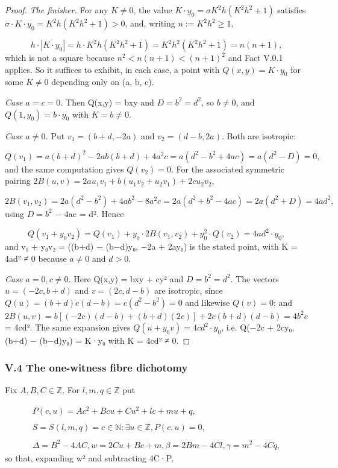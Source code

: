 \documentclass[11pt]{article}
\theoremstyle{plain}
\theoremstyle{definition}
\theoremstyle{remark}
\theoremstyle{plain}
\theoremstyle{definition}
\theoremstyle{remark}
\theoremstyle{plain}
\theoremstyle{definition}
\theoremstyle{remark}
\begin{document}
\begin{proof}
\emph{The finisher.} For any $K ≠ 0$, the value $K·y_{0} = σK^{2}h(K^{2}h^{2} + 1)$ satisfies $σ·K·y_{0} = K^{2}h(K^{2}h^{2} + 1) > 0$, and, writing $n := K^{2}h^{2} ≥ 1$,

\[
h·|K·y_{0}| = h·K^{2}h(K^{2}h^{2} + 1) = K^{2}h^{2}(K^{2}h^{2} + 1) = n(n + 1),
\]
which is not a square because $n^{2} < n(n+1) < (n+1)^{2}$ and Fact V.0.1 applies. So it suffices to exhibit, in each case, a point with $Q(x,y) = K·y_{0}$ for some $K ≠ 0$ depending only on (a, b, c).

\emph{Case $a = c = 0$.} Then Q(x,y) = bxy and $D = b^{2} = d^{2}$, so $b ≠ 0$, and $Q(1, y_{0}) = b·y_{0}$ with $K = b ≠ 0$.

\emph{Case $a ≠ 0$.} Put $v_{1} = (b+d, −2a)$ and $v_{2} = (d−b, 2a)$. Both are isotropic:

\[
Q(v_{1}) = a(b+d)^{2} − 2ab(b+d) + 4a^{2}c = a(d^{2} − b^{2} + 4ac) = a(d^{2} − D) = 0,
\]
and the same computation gives $Q(v_{2}) = 0$. For the associated symmetric pairing $2B(u,v) = 2a u_{1}v_{1} + b(u_{1}v_{2} + u_{2}v_{1}) + 2c u_{2}v_{2}$,

\[
2B(v_{1},v_{2}) = 2a(d^{2} − b^{2}) + 4ab^{2} − 8a^{2}c = 2a(d^{2} + b^{2} − 4ac) = 2a(d^{2} + D) = 4ad^{2},
\]
using $D = b^{2}$ − 4ac = d². Hence

\[
Q(v_{1} + y_{0}v_{2}) = Q(v_{1}) + y_{0}·2B(v_{1},v_{2}) + y_{0}^{2}·Q(v_{2}) = 4ad^{2}·y_{0},
\]
and v₁ + y₀v₂ = ((b+d) − (b−d)y₀, −2a + 2ay₀) is the stated point, with K = 4ad² ≠ 0 because $a ≠ 0$ and $d > 0$.

\emph{Case $a = 0, c ≠ 0$.} Here Q(x,y) = bxy + cy² and $D = b^{2} = d^{2}$. The vectors $u = (−2c, b+d)$ and $v = (2c, d−b)$ are isotropic, since $Q(u) = (b+d)c(d−b) = c(d^{2} − b^{2}) = 0$ and likewise $Q(v) = 0$; and $2B(u,v) = b[(−2c)(d−b) + (b+d)(2c)] + 2c(b+d)(d−b) = 4b^{2}c$ = 4cd². The same expansion gives $Q(u + y_{0}v) = 4cd^{2}·y_{0}$, i.e. Q(−2c + 2cy₀, (b+d) − (b−d)y₀) = K·y₀ with K = 4cd² ≠ 0.

\end{proof}
\subsubsection*{V.4 The one-witness fibre dichotomy}
Fix $A, B, C ∈ ℤ$. For $l, m, q ∈ ℤ$ put

\[
\begin{gathered}
P(c,u) = A c^{2} + B cu + C u^{2} + l c + m u + q, \\ \\
S = S(l,m,q) = {c ∈ ℕ : ∃ u ∈ ℤ, P(c,u) = 0}, \\ \\
Δ = B^{2} − 4AC,  w = 2Cu + Bc + m,  β = 2Bm − 4Cl,  γ = m^{2} − 4Cq,
\end{gathered}
\]
so that, expanding w² and subtracting 4C·P,
\end{document}
